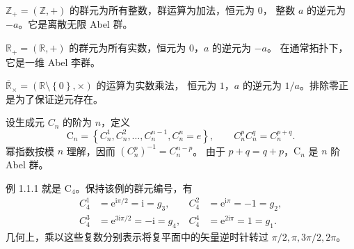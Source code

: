 \begin{example}[整数加法群]
$\mathbb{Z}_+=\left(\mathbb{Z},+\right)$ 的群元为所有整数，群运算为加法，恒元为 $0$，
整数 $a$ 的逆元为 $-a$。它是离散无限 Abel 群。
\end{example}

\begin{example}[实数加法群]
$\mathbb{R}_+=\left(\mathbb{R},+\right)$ 的群元为所有实数，恒元为 $0$，$a$ 的逆元为 $-a$。
在通常拓扑下，它是一维 Abel 李群。
\end{example}

\begin{example}[非零实数乘法群]
$\overline{\mathbb{R}}_{\times}=\left(\mathbb{R}\setminus\left\{0\right\},\times\right)$ 的运算为实数乘法，
恒元为 $1$，$a$ 的逆元为 $1/a$。排除零正是为了保证逆元存在。
\end{example}

\begin{example}[有限循环群]
设生成元 $C_n$ 的阶为 $n$，定义
\begin{equation}
\mathrm{C}_n=\left\{C_n^1,C_n^2,\ldots,C_n^{n-1},C_n^n=e\right\},
\qquad C_n^pC_n^q=C_n^{p+q}.
\end{equation}
幂指数按模 $n$ 理解，因而 $\left(C_n^p\right)^{-1}=C_n^{n-p}$。
由于 $p+q=q+p$，$\mathrm{C}_n$ 是 $n$ 阶 Abel 群。

例 1.1.1 就是 $\mathrm{C}_4$。保持该例的群元编号，有
\begin{align}
C_4^1&=\mathrm{e}^{\mathrm{i}\pi/2}=\mathrm{i}=g_3,&
C_4^2&=\mathrm{e}^{\mathrm{i}\pi}=-1=g_2,\\
C_4^3&=\mathrm{e}^{3\mathrm{i}\pi/2}=-\mathrm{i}=g_4,&
C_4^4&=\mathrm{e}^{2\mathrm{i}\pi}=1=g_1.
\end{align}
几何上，乘以这些复数分别表示将复平面中的矢量逆时针转过
$\pi/2,\pi,3\pi/2,2\pi$。
\end{example}

